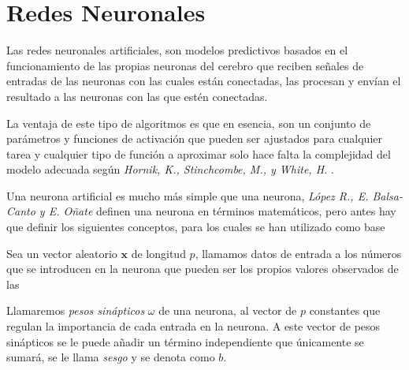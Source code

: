 \newpage
\section{Redes Neuronales}

\noindent Las redes neuronales artificiales, son modelos predictivos basados en el funcionamiento de las propias neuronas del cerebro que reciben señales de entradas de las neuronas con las cuales están conectadas, las procesan y envían el resultado a las neuronas con las que estén conectadas. 

\noindent La ventaja de este tipo de algoritmos es que en esencia, son un conjunto de parámetros y funciones de activación que pueden ser ajustados para cualquier tarea y cualquier tipo de función a aproximar solo hace falta la complejidad del modelo adecuada según \emph{Hornik, K., Stinchcombe, M., y  White, H.} \cite{Hornik 1989}.  

\noindent Una neurona artificial es mucho más simple que una neurona, \emph{López R., E. Balsa-Canto y E. Oñate} \cite{Roberto 2008} definen una neurona en términos matemáticos, pero antes hay que definir los siguientes conceptos, para los cuales se han utilizado como base \cite{Grossi 2007, Neural Designer}

\noindent Sea un vector aleatorio $\mathbf{x}$ de longitud $p$, llamamos datos de entrada a los números que se introducen en la neurona que pueden ser los propios valores observados de las 
\begin{defi}
Llamaremos \emph{pesos sinápticos} $\omega$ de una neurona, al vector de $p$ constantes que regulan la importancia de cada entrada en la neurona.  A este vector de pesos sinápticos se le puede añadir un término independiente que únicamente se sumará, se le llama \emph{sesgo} y se denota como $b$.
\end{defi}

